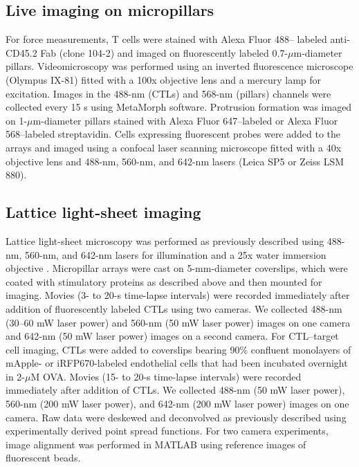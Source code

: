 \subsection{Live imaging on micropillars}
For force measurements, T cells were stained with Alexa Fluor 488– labeled anti-CD45.2 Fab (clone 104-2) and imaged on fluorescently labeled 0.7-$\mu$m-diameter pillars. Videomicroscopy was performed using an inverted fluorescence microscope (Olympus IX-81) fitted with a 100x objective lens and a mercury lamp for excitation. Images in the 488-nm (CTLs) and 568-nm (pillars) channels were collected every 15 s using MetaMorph software. Protrusion formation was imaged on 1-$\mu$m-diameter pillars stained with Alexa Fluor 647–labeled or Alexa Fluor 568–labeled streptavidin. Cells expressing fluorescent probes were added to the arrays and imaged using a confocal laser scanning microscope fitted with a 40x objective lens and 488-nm, 560-nm, and 642-nm lasers (Leica SP5 or Zeiss LSM 880).

\subsection{Lattice light-sheet imaging}
Lattice light-sheet microscopy was performed as previously described using 488-nm, 560-nm, and 642-nm lasers for illumination and a 25x water immersion objective \cite{Chen2014}. Micropillar arrays were cast on 5-mm-diameter coverslips, which were coated with stimulatory proteins as described above and then mounted for imaging. Movies (3- to 20-s time-lapse intervals) were recorded immediately after addition of fluorescently labeled CTLs using two cameras. We collected 488-nm (30–60 mW laser power) and 560-nm (50 mW laser power) images on one camera and 642-nm (50 mW laser power) images on a second camera. For CTL–target cell imaging, CTLs were added to coverslips bearing 90\% confluent monolayers of mApple- or iRFP670-labeled endothelial cells that had been incubated overnight in 2-$\mu$M OVA. Movies (15- to 20-s time-lapse intervals) were recorded immediately after addition of CTLs. We collected 488-nm (50 mW laser power), 560-nm (200 mW laser power), and 642-nm (200 mW laser power) images on one camera. Raw data were deskewed and deconvolved as previously described \cite{Chen2014} using experimentally derived point spread functions. For two camera experiments, image alignment was performed in MATLAB using reference images of fluorescent beads.

